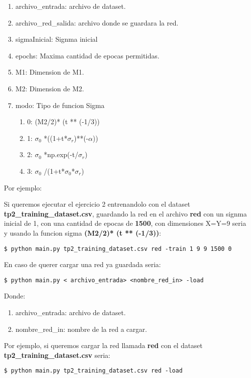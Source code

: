 \begin{enumerate}
\item archivo\_entrada: archivo de dataset.
\item archivo\_red\_salida: archivo donde se guardara la red.
\item sigmaInicial: Signma inicial
\item epochs: Maxima cantidad de epocas permitidas.
\item M1: Dimension de M1.
\item M2: Dimension de M2.
\item modo: Tipo de funcion Sigma
\begin{enumerate}
\item 0: (M2/2)* (t ** (-1/3))
\item 1: $\sigma_0$ *((1+t*$\sigma_r$)**(-$\alpha$))
\item 2: $\sigma_0$ *np.exp(-t/$\sigma_r$)
\item 3: $\sigma_0$ /(1+t*$\sigma_0$*$\sigma_r$) 
\end{enumerate}
\end{enumerate}

Por ejemplo: 

Si queremos ejecutar el ejercicio 2 entrenandolo con el dataset \textbf{tp2\_training\_dataset.csv}, guardando la red en el archivo \textbf{red} con un signma inicial de 1, con una cantidad de epocas de \textbf{1500}, con dimensiones X=Y=9 seria y usando la funcion sigma \textbf{(M2/2)* (t ** (-1/3))}:

\begin{verbatim}
$ python main.py tp2_training_dataset.csv red -train 1 9 9 1500 0
\end{verbatim}

En caso de querer cargar una red ya guardada seria:

\begin{verbatim}
$ python main.py < archivo_entrada> <nombre_red_in> -load 
\end{verbatim}

Donde:

\begin{enumerate}
\item archivo\_entrada: archivo de dataset.
\item nombre\_red\_in: nombre de la red a cargar.
\end{enumerate}

Por ejemplo, si queremos cargar la red llamada \textbf{red} con el dataset \textbf{tp2\_training\_dataset.csv} seria:

\begin{verbatim}
$ python main.py tp2_training_dataset.csv red -load
\end{verbatim}

